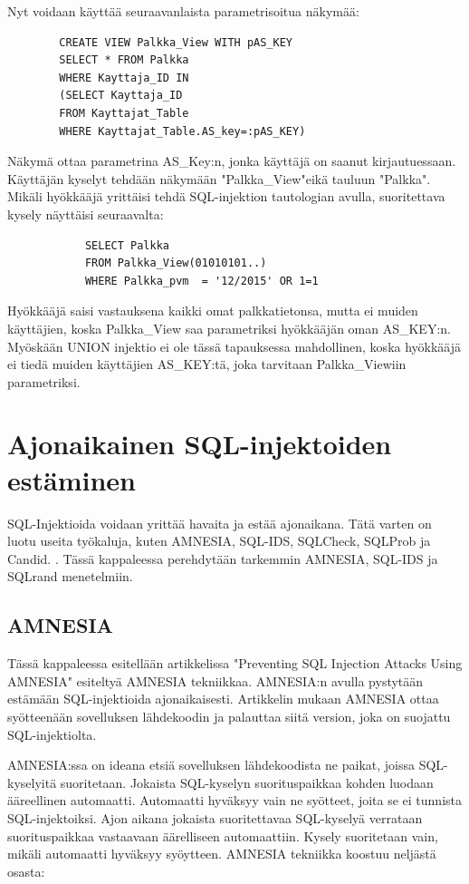 \documentclass[finnish]{tktltiki2}
\theoremstyle{definition}
\theoremstyle{remark}
\begin{document}
		Nyt voidaan käyttää seuraavanlaista parametrisoitua näkymää:
		\begin{lstlisting}
		CREATE VIEW Palkka_View WITH pAS_KEY
		SELECT * FROM Palkka
		WHERE Kayttaja_ID IN
		(SELECT Kayttaja_ID
		FROM Kayttajat_Table
		WHERE Kayttajat_Table.AS_key=:pAS_KEY) 
		\end{lstlisting}
		Näkymä ottaa parametrina AS\_Key:n, jonka käyttäjä on saanut kirjautuessaan. Käyttäjän kyselyt tehdään näkymään "Palkka\_View"\space eikä tauluun "Palkka". Mikäli hyökkääjä yrittäisi tehdä SQL-injektion tautologian avulla, suoritettava kysely näyttäisi seuraavalta:
		\begin{lstlisting}
			SELECT Palkka
			FROM Palkka_View(01010101..) 
			WHERE Palkka_pvm  = '12/2015' OR 1=1
		\end{lstlisting}
		Hyökkääjä saisi vastauksena kaikki omat palkkatietonsa, mutta ei muiden käyttäjien, koska Palkka\_View saa parametriksi hyökkääjän oman AS\_KEY:n. Myöskään UNION injektio ei ole tässä tapauksessa mahdollinen, koska hyökkääjä ei tiedä muiden käyttäjien AS\_KEY:tä, joka tarvitaan Palkka\_Viewiin parametriksi.
	
	\section{Ajonaikainen SQL-injektoiden estäminen}
	SQL-Injektioida voidaan yrittää havaita ja estää ajonaikana. Tätä varten on luotu useita työkaluja, kuten AMNESIA, SQL-IDS, SQLCheck, SQLProb ja Candid. \cite{preventions}. Tässä kappaleessa perehdytään tarkemmin AMNESIA, SQL-IDS ja SQLrand menetelmiin.
	
	\subsection{AMNESIA}
	Tässä kappaleessa esitellään artikkelissa "Preventing SQL Injection Attacks Using AMNESIA"\space\cite{amnesia} esiteltyä AMNESIA tekniikkaa. AMNESIA:n avulla pystytään estämään SQL-injektioida ajonaikaisesti. Artikkelin mukaan AMNESIA ottaa syötteenään sovelluksen lähdekoodin ja palauttaa siitä version, joka on suojattu SQL-injektiolta.
	
	 AMNESIA:ssa on ideana etsiä sovelluksen lähdekoodista ne paikat, joissa SQL-kyselyitä suoritetaan. Jokaista SQL-kyselyn suorituspaikkaa kohden luodaan ääreellinen automaatti. Automaatti hyväksyy vain ne syötteet, joita se ei tunnista SQL-injektoiksi. Ajon aikana jokaista suoritettavaa SQL-kyselyä verrataan suorituspaikkaa vastaavaan äärelliseen automaattiin. Kysely suoritetaan vain, mikäli automaatti hyväksyy syöytteen. AMNESIA tekniikka koostuu neljästä osasta:
\end{document}
